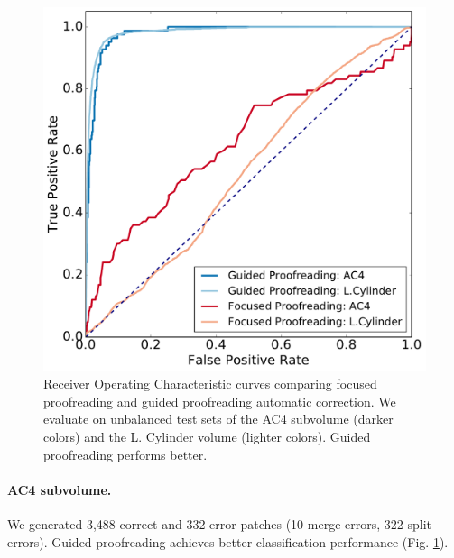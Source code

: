 \begin{figure}[t]
\centering
\includegraphics[width=0.9\linewidth]{gfx/roc.pdf}
\caption{Receiver Operating Characteristic curves comparing focused proofreading and guided proofreading automatic correction. We evaluate on unbalanced test sets of the AC4 subvolume (darker colors) and the L. Cylinder volume (lighter colors). Guided proofreading performs better.}
\label{fig:pr}
\vspace{-4mm}
\end{figure}

\vspace{-2mm}

\paragraph{AC4 subvolume.} We generated 3,488 correct and 332 error patches (10 merge errors, 322 split errors). Guided proofreading achieves better classification performance (Fig. \ref{fig:pr}).



